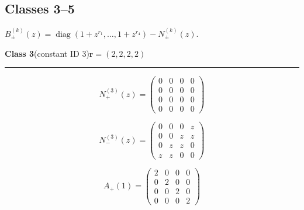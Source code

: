\subsection*{Classes 3--5}
\noindent $B_\pm^{(k)}(z)=\operatorname{diag}(1+z^{r_1},\ldots,1+z^{r_4})-N_\pm^{(k)}(z)$.\par\medskip
\noindent\begin{minipage}{\linewidth}
\noindent\textbf{Class 3}\quad\small (constant ID 3)\hfill $\symbf{r}=(2,2,2,2)$
\par\smallskip\noindent\textcolor{rulegray}{\rule{\linewidth}{0.3pt}}
\begin{minipage}[c]{0.495\linewidth}\centering\fontsize{9.7}{12}\selectfont
\setlength{\abovedisplayskip}{4pt}\setlength{\belowdisplayskip}{4pt}
\setlength{\abovedisplayshortskip}{4pt}\setlength{\belowdisplayshortskip}{4pt}
\setlength{\arraycolsep}{3pt}\renewcommand{\arraystretch}{1.08}
\[N_{+}^{(3)}(z)=\begin{pmatrix}0 & 0 & 0 & 0\\0 & 0 & 0 & 0\\0 & 0 & 0 & 0\\0 & 0 & 0 & 0\end{pmatrix}\]
\end{minipage}%
\begin{minipage}[c]{0.495\linewidth}\centering\fontsize{9.7}{12}\selectfont
\setlength{\abovedisplayskip}{4pt}\setlength{\belowdisplayskip}{4pt}
\setlength{\abovedisplayshortskip}{4pt}\setlength{\belowdisplayshortskip}{4pt}
\setlength{\arraycolsep}{3pt}\renewcommand{\arraystretch}{1.08}
\[N_{-}^{(3)}(z)=\begin{pmatrix}0 & 0 & 0 & z\\0 & 0 & z & z\\0 & z & z & 0\\z & z & 0 & 0\end{pmatrix}\]
\end{minipage}%
\par\noindent
\begin{minipage}[c]{0.495\linewidth}\centering\fontsize{9.7}{12}\selectfont
\setlength{\abovedisplayskip}{4pt}\setlength{\belowdisplayskip}{4pt}
\setlength{\abovedisplayshortskip}{4pt}\setlength{\belowdisplayshortskip}{4pt}
\setlength{\arraycolsep}{3pt}\renewcommand{\arraystretch}{1.08}
\[A_{+}(1)=\begin{pmatrix}2 & 0 & 0 & 0\\0 & 2 & 0 & 0\\0 & 0 & 2 & 0\\0 & 0 & 0 & 2\end{pmatrix}\]

\end{minipage}
\end{minipage}
